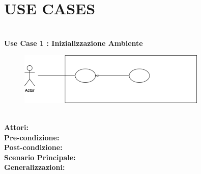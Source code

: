 \section{USE CASES}
\Large\textbf{}\\
\Large\textbf{Use Case 1 : Inizializzazione Ambiente} \\
\vspace{0.5cm}
\begin{figure}[h]
  \centering
  \includegraphics[width=0.8\textwidth]{UC1.png}
\end{figure}

\large\textbf{} \\
\textbf{Attori:} \\
\textbf{Pre-condizione:} \\
\textbf{Post-condizione:} \\
\textbf{Scenario Principale:} \\
\textbf{Generalizzazioni:} \\

\vspace{0.5cm}




